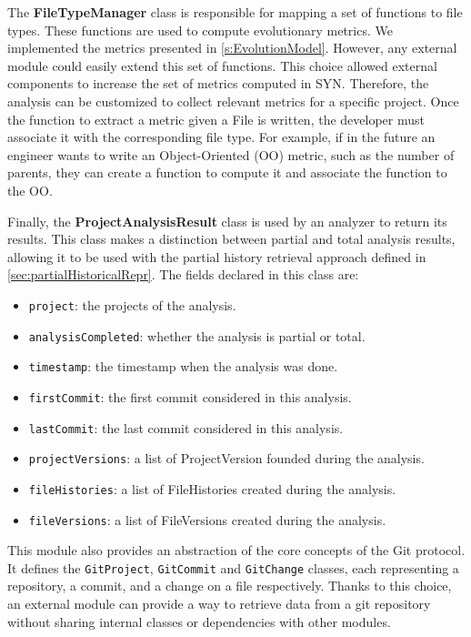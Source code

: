 The \textbf{FileTypeManager} class is responsible for mapping a set of functions to file types. These functions are used to compute evolutionary metrics. We implemented the metrics presented in \autoref{s:EvolutionModel}. However, any external module could easily extend this set of functions. This choice allowed external components to increase the set of metrics computed in SYN. Therefore, the analysis can be customized to collect relevant metrics for a specific project. Once the function to extract a metric given a File is written, the developer must associate it with the corresponding file type. For example, if in the future an engineer wants to write an  Object-Oriented (OO) metric, such as the number of parents, they can create a function to compute it and associate the function to the OO.

Finally, the \textbf{ProjectAnalysisResult} class is used by an analyzer to return its results. This class makes a distinction between partial and total analysis results, allowing it to be used with the partial history retrieval approach defined in \autoref{sec:partialHistoricalRepr}. The fields declared in this class are:
\begin{itemize}
    \item \texttt{project}: the projects of the analysis.
    \item \texttt{analysisCompleted}: whether the analysis is partial or total.
    \item \texttt{timestamp}: the timestamp when the analysis was done. 
    \item \texttt{firstCommit}: the first commit considered in this analysis. 
    \item \texttt{lastCommit}: the last commit considered in this analysis. 
    \item \texttt{projectVersions}: a list of ProjectVersion founded during the analysis.
    \item \texttt{fileHistories}: a list of FileHistories created during the analysis.
    \item \texttt{fileVersions}: a list of FileVersions created during the analysis.
\end{itemize}

This module also provides an abstraction of the core concepts of the Git protocol. It defines the \texttt{GitProject}, \texttt{GitCommit} and \texttt{GitChange} classes, each representing a repository, a commit, and a change on a file respectively. 
Thanks to this choice, an external module can provide a way to retrieve data from a git repository without sharing internal classes or dependencies with other modules. 


